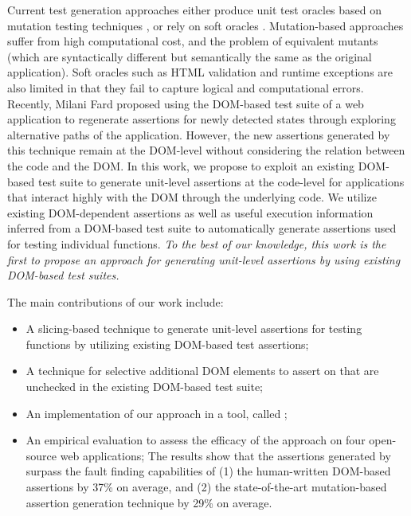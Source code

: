 Current test generation approaches either produce unit test oracles based on mutation testing techniques \cite{mirshokraie:icst15, fraser:tse12}, or rely on soft oracles \cite{artzi:icse11}. Mutation-based approaches suffer from high computational cost, and the problem of equivalent mutants (which are syntactically different but semantically the same as the original application).
Soft oracles such as HTML validation and runtime exceptions are also limited in that they fail to capture logical and computational errors. 
Recently, Milani Fard \etal \cite{milanifard:ase14} proposed using the DOM-based test suite of a web application to regenerate assertions for newly detected states through exploring alternative paths of the application. However, the new assertions generated by this technique remain at the DOM-level without considering the relation between the \javascript code and the DOM.
In this work, we propose to exploit an existing DOM-based test suite to generate unit-level assertions at the code-level for applications that interact highly with the DOM through the underlying \javascript code. We utilize
existing DOM-dependent assertions as well as useful execution information inferred from a DOM-based test suite to automatically generate assertions used for testing individual \javascript functions. 
{\em To the best of our knowledge, this work is the first to propose an approach for generating unit-level assertions by using existing DOM-based test suites.} 

The main contributions of our work include:
\begin{itemize}[noitemsep]
\item A slicing-based technique to generate unit-level assertions for testing \javascript functions by utilizing existing DOM-based test assertions;
\item A technique for selective additional DOM elements to assert on that are unchecked in the existing DOM-based test suite;
\item An implementation of our approach in a tool, called \tool; 
\item An empirical evaluation to assess the efficacy of the approach on four open-source web applications;
The results show that the assertions generated by \tool surpass the fault finding capabilities of (1) the human-written DOM-based assertions by 37\% on average, and (2) the state-of-the-art mutation-based assertion generation technique by 29\% on average.
\end{itemize} 